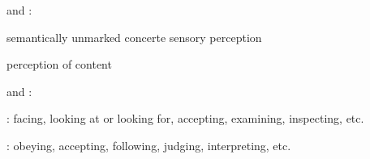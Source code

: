 \begin{hopoint}
	\begin{compactitem}
		\item {} and :
			\begin{compactitem}
				\item semantically unmarked concerte sensory perception
				\item perception of content
			\end{compactitem}
		\item {} and :
			\begin{compactitem}
				\item {}: facing, looking at or looking for, accepting, examining, inspecting, etc.
				\item {}: obeying, accepting, following, judging, interpreting, etc.
			\end{compactitem}
	\end{compactitem}
\end{hopoint}


